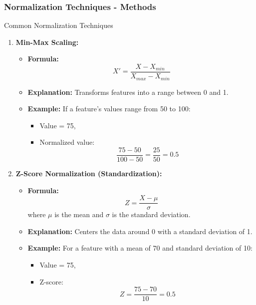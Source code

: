 \documentclass[aspectratio=169]{beamer}
\begin{document}
\begin{frame}[fragile]
    \frametitle{Normalization Techniques - Methods}
    \begin{block}{Common Normalization Techniques}
        \begin{enumerate}
            \item \textbf{Min-Max Scaling:}
                \begin{itemize}
                    \item \textbf{Formula:} 
                    \[
                    X' = \frac{X - X_{min}}{X_{max} - X_{min}}
                    \]
                    \item \textbf{Explanation:} Transforms features into a range between 0 and 1.
                    \item \textbf{Example:} If a feature's values range from 50 to 100:
                    \begin{itemize}
                        \item Value = 75,
                        \item Normalized value: 
                        \[
                        \frac{75 - 50}{100 - 50} = \frac{25}{50} = 0.5
                        \]
                    \end{itemize}
                \end{itemize}
                
            \item \textbf{Z-Score Normalization (Standardization):}
                \begin{itemize}
                    \item \textbf{Formula:}
                    \[
                    Z = \frac{X - \mu}{\sigma}
                    \]
                    where \( \mu \) is the mean and \( \sigma \) is the standard deviation.
                    \item \textbf{Explanation:} Centers the data around 0 with a standard deviation of 1.
                    \item \textbf{Example:} For a feature with a mean of 70 and standard deviation of 10:
                    \begin{itemize}
                        \item Value = 75,
                        \item Z-score: 
                        \[
                        Z = \frac{75 - 70}{10} = 0.5
                        \]
                    \end{itemize}
                \end{itemize}
        \end{enumerate}
    \end{block}
\end{frame}
\end{document}
